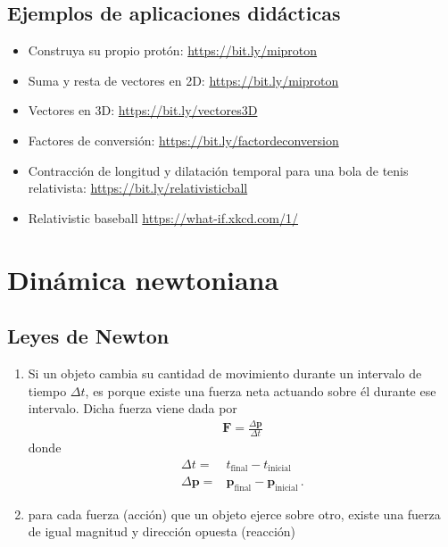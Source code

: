 \documentclass[11pt,a4paper]{book}
\begin{document}
\section{Ejemplos de aplicaciones didácticas}
\begin{itemize}
    \item Construya su propio protón: \url{https://bit.ly/miproton}
 \item Suma y resta de vectores en 2D: \url{https://bit.ly/miproton}
 \item Vectores en 3D: \url{https://bit.ly/vectores3D}
 \item Factores de conversión: \url{https://bit.ly/factordeconversion}
 \item Contracción de longitud y dilatación temporal para una bola de tenis relativista: \url{https://bit.ly/relativisticball}
 \item Relativistic baseball \url{https://what-if.xkcd.com/1/}

\end{itemize}


\chapter{Dinámica newtoniana}
\section{Leyes de Newton}
\begin{enumerate}
    \item Si un objeto cambia su  cantidad de movimiento durante un intervalo de tiempo $\Delta t$, es porque existe una fuerza neta actuando sobre él durante ese intervalo.  Dicha fuerza viene dada por
    \begin{align}
        \label{eq:newton}
        \boldsymbol{F} = \frac{\Delta \boldsymbol{p}}{\Delta t}
    \end{align}
    donde
    \begin{align}
    \Delta t =& t_{\text{final}}-t_{\text{inicial}}\\
    \Delta\boldsymbol{p} =& \boldsymbol{p}_{\text{final}}
    - \boldsymbol{p}_{\text{inicial}}\,.    
    \end{align}

\item  para cada fuerza (acción) que un objeto ejerce sobre otro, existe una fuerza de igual magnitud y dirección opuesta (reacción)
\end{enumerate}
\end{document}

